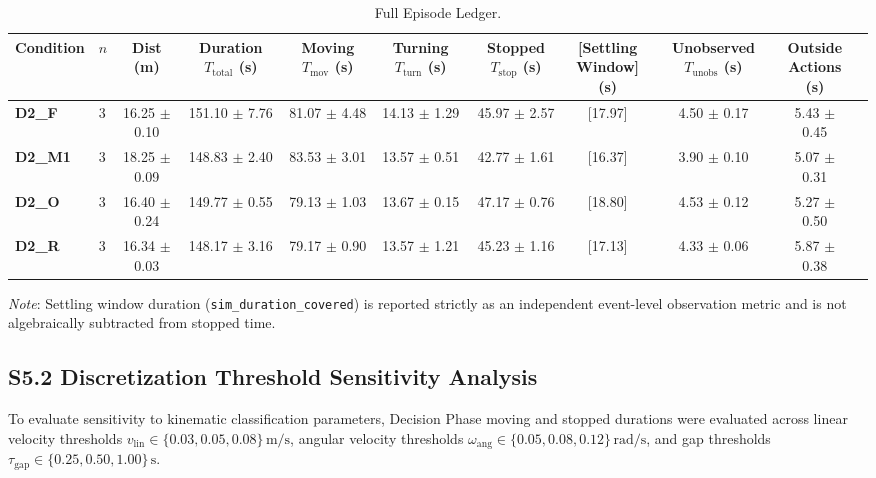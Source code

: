 \documentclass[10pt]{article}
\begin{document}
\begin{table}[t]
\centering
\footnotesize
\caption{Full Episode Ledger.}
\label{tab:ledger_full}
\setlength{\tabcolsep}{2.8pt}
\begin{tabular*}{\textwidth}{@{\extracolsep{\fill}}llccccccccc@{}}
\toprule
Condition & $n$ & \shortstack{Dist\\(m)} & \shortstack{Duration\\$T_{\text{total}}$ (s)} & \shortstack{Moving\\$T_{\text{mov}}$ (s)} & \shortstack{Turning\\$T_{\text{turn}}$ (s)} & \shortstack{Stopped\\$T_{\text{stop}}$ (s)} & \shortstack{[Settling\\Window] (s)} & \shortstack{Unobserved\\$T_{\text{unobs}}$ (s)} & \shortstack{Outside\\Actions (s)} \\
\midrule
\textbf{D2\_F}  & 3 & 16.25 $\pm$ 0.10 & 151.10 $\pm$ 7.76 & 81.07 $\pm$ 4.48 & 14.13 $\pm$ 1.29 & 45.97 $\pm$ 2.57 & [17.97] & 4.50 $\pm$ 0.17 & 5.43 $\pm$ 0.45 \\
\textbf{D2\_M1} & 3 & 18.25 $\pm$ 0.09 & 148.83 $\pm$ 2.40 & 83.53 $\pm$ 3.01 & 13.57 $\pm$ 0.51 & 42.77 $\pm$ 1.61 & [16.37] & 3.90 $\pm$ 0.10 & 5.07 $\pm$ 0.31 \\
\textbf{D2\_O}  & 3 & 16.40 $\pm$ 0.24 & 149.77 $\pm$ 0.55 & 79.13 $\pm$ 1.03 & 13.67 $\pm$ 0.15 & 47.17 $\pm$ 0.76 & [18.80] & 4.53 $\pm$ 0.12 & 5.27 $\pm$ 0.50 \\
\textbf{D2\_R}  & 3 & 16.34 $\pm$ 0.03 & 148.17 $\pm$ 3.16 & 79.17 $\pm$ 0.90 & 13.57 $\pm$ 1.21 & 45.23 $\pm$ 1.16 & [17.13] & 4.33 $\pm$ 0.06 & 5.87 $\pm$ 0.38 \\
\bottomrule
\end{tabular*}
\end{table}

\noindent\emph{Note}: Settling window duration (\texttt{sim\_duration\_covered}) is reported strictly as an independent event-level observation metric and is not algebraically subtracted from stopped time.

\subsection{S5.2 Discretization Threshold Sensitivity Analysis}
To evaluate sensitivity to kinematic classification parameters, Decision Phase moving and stopped durations were evaluated across linear velocity thresholds $v_{\text{lin}} \in \{0.03, 0.05, 0.08\}\,\text{m/s}$, angular velocity thresholds $\omega_{\text{ang}} \in \{0.05, 0.08, 0.12\}\,\text{rad/s}$, and gap thresholds $\tau_{\text{gap}} \in \{0.25, 0.50, 1.00\}\,\text{s}$.
\end{document}
